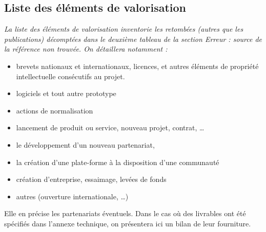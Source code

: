 \documentclass[a4paper,11pt]{article}
\newcommand{\instructions}[1]{%
		{%
			\setlength{\parindent}{0cm}%
			{\em\color{ANRvert}#1}%
		}%
	}
\newcommand{\instructions}[1]{}
\begin{document}
\subsection{Liste des éléments de valorisation}\label{subsection-valorisation}

\instructions{%
La liste des éléments de valorisation inventorie les retombées (autres que les publications) décomptées dans le deuxième tableau de la section Erreur : source de la référence non trouvée. On détaillera notamment :
\begin{itemize}
	\item brevets nationaux et internationaux, licences, et autres éléments de propriété intellectuelle consécutifs au projet.
	\item logiciels et tout autre prototype
	\item actions de normalisation 
	\item lancement de produit ou service, nouveau projet, contrat, …
	\item le développement d'un nouveau partenariat,
	\item la création d'une plate-forme à la disposition d'une communauté
	\item création d'entreprise, essaimage, levées de fonds
	\item autres (ouverture internationale, …)
\end{itemize}

Elle en précise les partenariats éventuels. Dans le cas où des livrables ont été spécifiés dans l'annexe technique, on présentera ici un bilan de leur fourniture.
}
\end{document}
